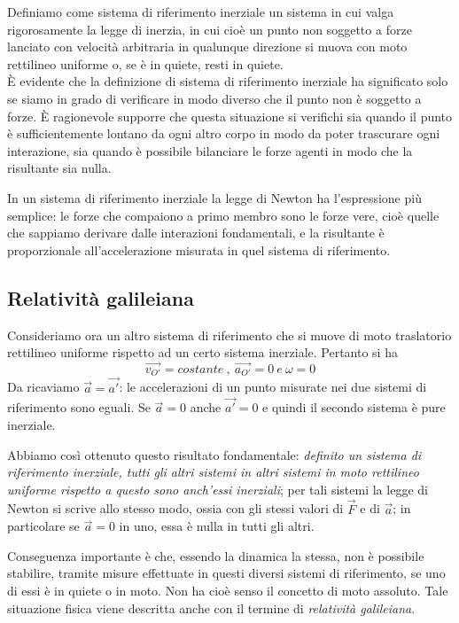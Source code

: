 \documentclass[class=book, crop=false, oneside, 12pt]{standalone}
\begin{document}
Definiamo come sistema di riferimento inerziale un sistema in cui valga rigorosamente la legge di inerzia, in cui cioè un punto non soggetto a forze lanciato con velocità arbitraria in qualunque direzione si muova con moto rettilineo uniforme o, se è in quiete, resti in quiete.\\
È evidente che la definizione di sistema di riferimento inerziale ha significato solo se siamo in grado di verificare in modo diverso che il punto non è soggetto a forze. 
È ragionevole supporre che questa situazione si verifichi sia quando il punto è sufficientemente lontano da ogni altro corpo in modo da poter trascurare  ogni interazione, sia quando è possibile bilanciare le forze agenti in modo che la risultante sia nulla.

In un sistema di riferimento inerziale la legge di Newton ha l'espressione più semplice: 
le forze che compaiono a primo membro sono le forze vere, cioè quelle che sappiamo derivare dalle interazioni fondamentali, e la risultante è proporzionale all'accelerazione misurata in quel sistema di riferimento. 

\subsection{Relatività galileiana}

Consideriamo ora un altro sistema di riferimento che si muove di moto traslatorio rettilineo uniforme rispetto ad un certo sistema inerziale. 
Pertanto si ha 
\begin{equation}
    \overrightarrow{v_{O'}} = costante \ , \ \overrightarrow{a_{O'}} = 0 \ e \ \omega = 0
\end{equation}
Da ricaviamo \(\overrightarrow{a} = \overrightarrow{a'}\): le accelerazioni di un punto misurate nei due sistemi di riferimento sono eguali. 
Se \(\overrightarrow{a} = 0\) anche \(\overrightarrow{a'}= 0\) e quindi il secondo sistema è pure inerziale. 

Abbiamo così ottenuto questo risultato fondamentale: \emph{definito un sistema di riferimento inerziale, tutti gli altri sistemi in altri sistemi in moto rettilineo uniforme rispetto a questo sono anch'essi inerziali};
per tali sistemi la legge di Newton si scrive allo stesso modo, ossia con gli stessi valori di \(\overrightarrow{F}\) e di \(\overrightarrow{a}\); in particolare se \(\overrightarrow{a} = 0\) in uno, essa è nulla in tutti gli altri.

Conseguenza importante è che, essendo la dinamica la stessa, non è possibile stabilire, tramite misure effettuate in questi diversi sistemi di riferimento, se uno di essi è in quiete o in moto. 
Non ha cioè senso il concetto di moto assoluto. 
Tale situazione fisica viene descritta anche con il termine di \emph{relatività galileiana}.
\end{document}
